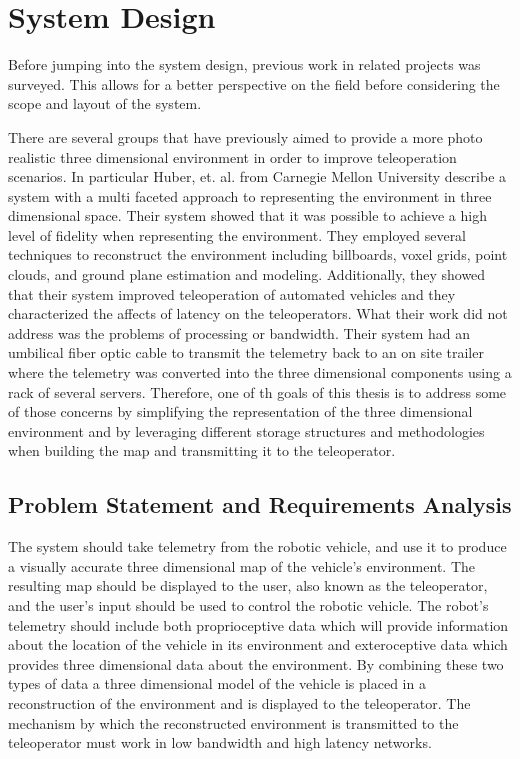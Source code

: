 \documentclass[12pt]{report}
\begin{document}

\chapter{System Design}\label{chap:system_design}
Before jumping into the system design, previous work in related projects was surveyed.  This allows for a better perspective on the field before considering the scope and layout of the system.

There are several groups that have previously aimed to provide a more photo realistic three dimensional environment in order to improve teleoperation scenarios.  In particular Huber, et. al. from Carnegie Mellon University describe a system with a multi faceted approach to representing the environment in three dimensional space\cite{photo_real}.  Their system showed that it was possible to achieve a high level of fidelity when representing the environment.  They employed several techniques to reconstruct the environment including billboards, voxel grids, point clouds, and ground plane estimation and modeling.  Additionally, they showed that their system improved teleoperation of automated vehicles and they characterized the affects of latency on the teleoperators.  What their work did not address was the problems of processing or bandwidth.  Their system had an umbilical fiber optic cable to transmit the telemetry back to an on site trailer where the telemetry was converted into the three dimensional components using a rack of several servers.  Therefore, one of th goals of this thesis is to address some of those concerns by simplifying the representation of the three dimensional environment and by leveraging different storage structures and methodologies when building the map and transmitting it to the teleoperator.

\section{Problem Statement and Requirements Analysis}
The system should take telemetry from the robotic vehicle, and use it to produce a visually accurate three dimensional map of the vehicle's environment.  The resulting map should be displayed to the user, also known as the teleoperator, and the user's input should be used to control the robotic vehicle.  The robot's telemetry should include both proprioceptive data which will provide information about the location of the vehicle in its environment and exteroceptive data which provides three dimensional data about the environment.  By combining these two types of data a three dimensional model of the vehicle is placed in a reconstruction of the environment and is displayed to the teleoperator.  The mechanism by which the reconstructed environment is transmitted to the teleoperator must work in low bandwidth and high latency networks.
\end{document}
